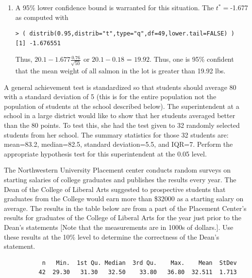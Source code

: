 \documentclass[10pt,openany]{book}\usepackage[]{graphicx}\usepackage[]{color}
\makeatletter
\newenvironment{kframe}{%
 \def\at@end@of@kframe{}%
 \ifinner\ifhmode%
  \def\at@end@of@kframe{\end{minipage}}%
  \begin{minipage}{\columnwidth}%
 \fi\fi%
 \def\FrameCommand##1{\hskip\@totalleftmargin \hskip-\fboxsep
 \colorbox{shadecolor}{##1}\hskip-\fboxsep
     \hskip-\linewidth \hskip-\@totalleftmargin \hskip\columnwidth}%
 \MakeFramed {\advance\hsize-\width
   \@totalleftmargin\z@ \linewidth\hsize
   \@setminipage}}%
 {\par\unskip\endMakeFramed%
 \at@end@of@kframe}
\newenvironment{knitrout}{}{} %
\makeatother
\begin{document}
\begin{enumerate}
    \item A 95\% lower confidence bound is warranted for this situation.  The $t^{*}=$-1.677 as computed with
\begin{knitrout}
\color{fgcolor}\begin{kframe}
\begin{verbatim}
> ( distrib(0.95,distrib="t",type="q",df=49,lower.tail=FALSE) )
[1] -1.676551
\end{verbatim}
\end{kframe}
\end{knitrout}
Thus, $20.1-1.677\frac{0.76}{\sqrt{50}}$ or $20.1-0.18$ = $19.92$.  Thus, one is 95\% confident that the mean weight of all salmon in the lot is greater than 19.92 lbs.
\end{enumerate}


\begin{exsection}
  \item \label{revex:tTestSuperInt} A general achievement test is standardized so that students should average 80 with a standard deviation of 5 (this is for the entire population not the population of students at the school described below).  The superintendent at a school in a large district would like to show that her students averaged better than the 80 points.  To test this, she had the test given to 32 randomly selected students from her school.  The summary statistics for those 32 students are: mean=83.2, median=82.5, standard deviation=5.5, and IQR=7.  Perform the appropriate hypothesis test for this superintendent at the 0.05 level. 

  \item \label{revex:tTestLASalary} The Northwestern University Placement center conducts random surveys on starting salaries of college graduates and publishes the results every year.  The Dean of the College of Liberal Arts suggested to prospective students that graduates from the College would earn more than \$32000 as a starting salary on average.  The results in the table below are from a part of the Placement Center's results for graduates of the College of Liberal Arts for the year just prior to the Dean's statements [Note that the measurements are in 1000s of dollars.].  Use these results at the 10\% level to determine the correctness of the Dean's statement. 
  \begin{center}
    \begin{Verbatim}
           n   Min.  1st Qu. Median  3rd Qu.    Max.    Mean  StDev
          42  29.30   31.30   32.50    33.80   36.80  32.511  1.713
    \end{Verbatim}
  \end{center}
\end{exsection}
\end{document}
